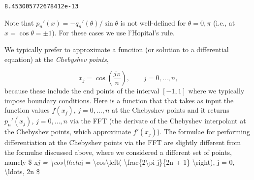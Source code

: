 \documentclass[12pt,a4paper]{article}
\begin{document}
\begin{lstlisting}
8.453005772678412e-13
\end{lstlisting}


Note that $p_n'(x) = -q_n'(\theta)/\sin \theta$ is not well-defined for $\theta = 0, \pi$ (i.e., at $x = \cos\theta =  \pm 1$).  For these cases we use l'Hopital's rule.

We typically prefer to approximate a function (or solution to a differential equation) at the \emph{Chebyshev points}, 

\[
x_j = \cos\left(\frac{j\pi}{n}\right), \qquad j = 0, \ldots, n,
\]
because these include the end points of the interval $[-1, 1]$ where we typically impose boundary conditions. Here is a function that that takes as input the function values $f(x_j)$, $j = 0, \ldots, n$ at the Chebyshev points and it returns $p_n'(x_j)$, $j = 0, \ldots, n$ via the FFT (the derivate of the Chebyshev interpolant at the Chebyshev points, which approximate $f'(x_j)$). The formulae for performing differentiation at the Chebyshev points via the FFT are slightly different from the formulae discussed above, where we considered a different set of points, namely \$ x\emph{j = {\textbackslash}cos{\textbackslash}theta}j = {\textbackslash}cos{\textbackslash}left( {\textbackslash}frac\{2{\textbackslash}pi j\}\{2n + 1\}  {\textbackslash}right), j = 0, {\textbackslash}ldots, 2n \$
\end{document}
